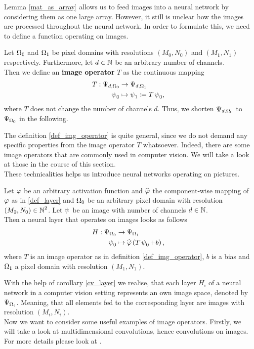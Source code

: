 Lemma \ref{mat_as_array} allows us to feed images into a neural network by considering them as one large array. However, it still is unclear how the images are processed throughout the neural network. In order to formulate this, we need to define a function operating on images.

\begin{definition}\label{def_img_operator}
Let $\Omega_0$ and $\Omega_1$ be pixel domains with resolutions $(M_0,N_0)$ and $(M_1,N_1)$ respectively. Furthermore, let $d\in\operatorname{\mathbb{N}}$ be an arbitrary number of channels.\\
Then we define an \textbf{image operator} $T$ as the continuous mapping
\begin{align*}
T: \Psi_{d,\Omega_0} &\to \Psi_{d,\Omega_1}\\
\operatorname{\psi}_0 &\mapsto \operatorname{\psi}_1 \coloneqq T \operatorname{\psi}_0,
\end{align*}
where $T$ does not change the number of channels $d$. Thus, we shorten $\Psi_{d,\Omega_0}$ to $\Psi_{\Omega_0}$ in the following.
\end{definition}

The definition \ref{def_img_operator} is quite general, since we do not demand any specific properties from the image operator $T$ whatsoever. Indeed, there are some image operators that are commonly used in computer vision. We will take a look at those in the course of this section.\\
These technicalities helps us introduce neural networks operating on pictures.

\begin{corollary}\label{cv_layer}
Let $\operatorname{\varphi}$ be an arbitrary activation function and $\widehat{\operatorname{\varphi}}$ the component-wise mapping of $\operatorname{\varphi}$ as in \ref{def_layer} and $\Omega_0$ be an arbitrary pixel domain with resolution $(M_0,N_0)\in\operatorname{\mathbb{N}}^2$. Let $\operatorname{\psi}$ be an image with number of channels $d\in\operatorname{\mathbb{N}}$.\\
Then a neural layer that operates on images looks as follows
\begin{align*}
H: \Psi_{\Omega_0} &\to \Psi_{\Omega_1}\\
\operatorname{\psi}_0 &\mapsto \widehat{\operatorname{\varphi}}\left(T\operatorname{\psi}_0 + b\right),
\end{align*}
where $T$ is an image operator as in definition \ref{def_img_operator}, $b$ is a bias and $\Omega_1$ a pixel domain with resolution $(M_1,N_1)$.
\end{corollary}

With the help of corollary \ref{cv_layer} we realise, that each layer $H_i$ of a neural network in a computer vision setting represents an own image space, denoted by $\Psi_{\Omega_i}$. Meaning, that all elements fed to the corresponding layer are images with resolution $(M_i,N_i)$.\\
Now we want to consider some useful examples of image operators. Firstly, we will take a look at multidimensional convolutions, hence convolutions on images. For more details please look at \cite[chapter~9]{goodfellow2016deep}.

